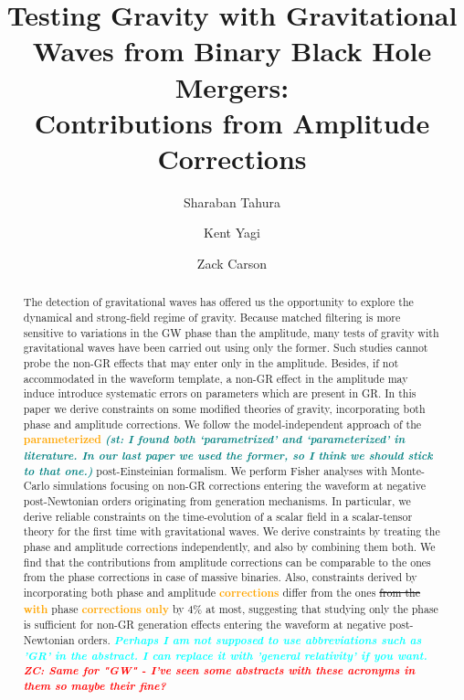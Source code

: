 \documentclass[prd,twocolumn,nofootinbib]{revtex4-1}
\newcommand{\st}[1]{\textcolor{cyan}{\it{\textbf{ #1}}} }
\newcommand{\shammi}[1]{\textcolor{teal}{\it{\textbf{(st: #1)}}} }
\newcommand{\zc}[1]{\textcolor{red}{\it{\textbf{ZC: #1}}} }
\newcommand{\zack}[1]{\textcolor{orange}{\textbf{#1}} }
\begin{document}
\title{Testing Gravity with Gravitational Waves from Binary Black Hole Mergers: \\ Contributions from Amplitude Corrections}

\author{Sharaban Tahura}

\author{Kent Yagi}

\author{Zack Carson}

\begin{abstract}
The detection of gravitational waves has offered us the opportunity to explore the dynamical and strong-field regime of gravity.
Because matched filtering is more sensitive to variations in the GW phase than the amplitude, many tests of gravity with gravitational waves have been carried out using only the former. Such studies cannot probe the non-GR effects that may enter only in the amplitude. Besides, if not accommodated in the waveform template, a non-GR effect in the amplitude may induce introduce systematic errors on parameters which are present in GR.
In this paper we derive constraints on some modified theories of gravity, incorporating both phase and amplitude corrections. We follow the model-independent approach of the \zack{parameterized} \shammi{I found both `parametrized' and `parameterized' in literature. In our last paper we used the former, so I think we should stick to that one.} post-Einsteinian formalism.
We perform Fisher analyses with Monte-Carlo simulations focusing on non-GR corrections entering the waveform at negative post-Newtonian orders originating from generation mechanisms.
In particular, we derive reliable constraints on the time-evolution of a scalar field in a scalar-tensor theory for the first time with gravitational waves.
We derive constraints by treating the phase and amplitude corrections independently, and also by combining them both.
We find that the contributions from amplitude corrections can be comparable to the ones from the phase corrections in case of massive binaries.
Also, constraints derived by incorporating both phase and amplitude \zack{corrections} differ from the ones \sout{from the} \zack{with} phase \zack{corrections only} by 4\% at most, suggesting that studying only the phase is sufficient for non-GR generation effects entering the waveform at negative post-Newtonian orders.
\st{Perhaps I am not supposed to use abbreviations such as 'GR' in the abstract. I can replace it with 'general relativity' if you want.}\zc{Same for "GW" - I've seen some abstracts with these acronyms in them so maybe their fine?}
\end{abstract}
\end{document}
